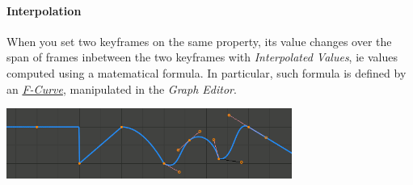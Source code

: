 \documentclass{article}
\begin{document}
\paragraph{Interpolation}
When you set two keyframes on the same property, its value changes over the span of frames inbetween the two keyframes with \textit{Interpolated Values}, ie values computed using
a matematical formula. In particular, such formula is defined by an \href{https://docs.blender.org/manual/en/4.3/editors/graph_editor/fcurves/introduction.html}{\textit{F-Curve}},
manipulated in the \textit{Graph Editor}.
\begin{center}
    \includegraphics[width=0.7\textwidth]{blender_docs_images/animation_keyframes_introduction_curves.png}
\end{center}
\end{document}
